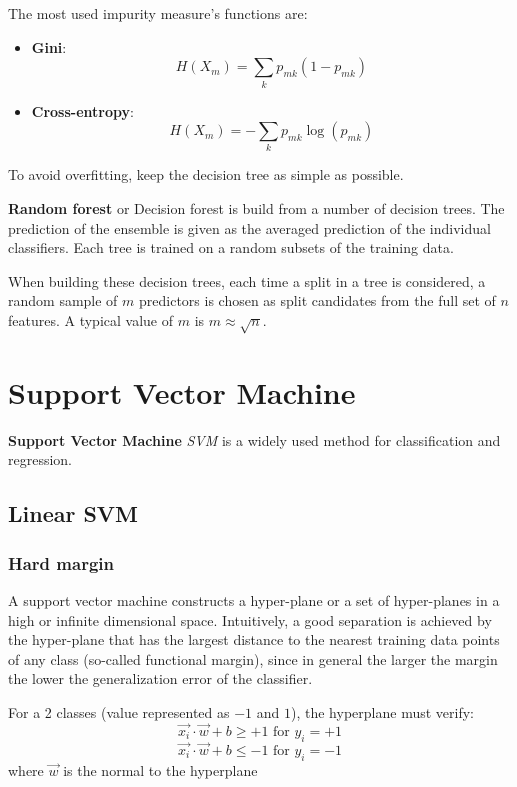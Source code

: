 The most used impurity measure's functions are:
\begin{itemize}
    \item \textbf{Gini}: $$H(X_m) = \sum_k p_{mk} (1 - p_{mk})$$
    \item \textbf{Cross-entropy}: $$ H(X_m) = - \sum_k p_{mk} \log(p_{mk}) $$
\end{itemize}

To avoid overfitting, keep the decision tree as simple as possible.

\textbf{Random forest} or Decision forest is build from a number of decision trees. The prediction of the ensemble is given as the averaged prediction of the individual classifiers. Each tree is trained on a random subsets of the training data.

When building these decision trees, each time a split in a tree is considered, a random sample of
$m$ predictors is chosen as split candidates from the full set of $n$ features. A typical value of $m$ is $m \approx \sqrt{n}$.

\section{Support Vector Machine}


\textbf{Support Vector Machine} \textit{SVM} is a widely used method for classification and regression.

\subsection{Linear SVM}
\subsubsection{Hard margin}

A support vector machine constructs a hyper-plane or a set of hyper-planes in a high or infinite dimensional space. Intuitively, a good separation is achieved by the hyper-plane that has the largest distance to the nearest training data points of any class (so-called functional margin), since in general the larger the margin the lower the generalization error of the classifier.

For a 2 classes (value represented as $-1$ and $1$), the hyperplane must verify:
\begin{equation}\label{eq:svm_1}
    \vec{x_i} \cdot \vec{w} + b \geq + 1 \text{ for } y_i = + 1
\end{equation}
\begin{equation}\label{eq:svm_2}
    \vec{x_i} \cdot \vec{w} + b \leq -1 \text{ for } y_i = - 1
\end{equation}
where $\vec{w}$ is the normal to the hyperplane

